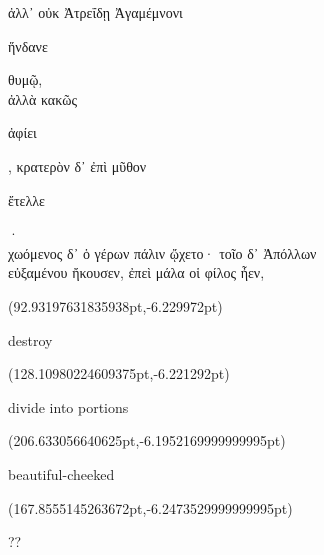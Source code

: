 \documentclass{ransom}
\begin{document}
\begin{foreignpage}
\begin{graytext}
ἀλλ᾽ οὐκ Ἀτρεΐδῃ Ἀγαμέμνονι \begin{whitetext}ἥνδανε\end{whitetext} θυμῷ,\\
ἀλλὰ κακῶς \begin{whitetext}ἀφίει\end{whitetext}, κρατερὸν δ᾽ ἐπὶ μῦθον \begin{whitetext}ἔτελλε\end{whitetext}·\\
χωόμενος δ᾽ ὁ γέρων πάλιν ᾤχετο· τοῖο δ᾽ Ἀπόλλων\hfill{}\\
εὐξαμένου ἤκουσεν, ἐπεὶ μάλα οἱ φίλος ἦεν,\\

\end{graytext}

{\linespread{1.0}\footnotesize \begin{textblock*}{62.27492pt}(92.93197631835938pt,\pdfpageheight-503.3775939941406pt-6.229972pt)\parbox[b]{62.27492pt}{\begin{blacktext}\begin{latin}destroy\end{latin}\end{blacktext}}\end{textblock*}
\begin{textblock*}{49.16702pt}(128.10980224609375pt,\pdfpageheight-476.3775939941406pt-6.221292pt)\parbox[b]{49.16702pt}{\begin{blacktext}\begin{latin}divide into portions\end{latin}\end{blacktext}}\end{textblock*}
\begin{textblock*}{66.25943pt}(206.633056640625pt,\pdfpageheight-449.3775939941406pt-6.1952169999999995pt)\parbox[b]{66.25943pt}{\begin{blacktext}\begin{latin}beautiful-cheeked\end{latin}\end{blacktext}}\end{textblock*}
\begin{textblock*}{59.48206pt}(167.8555145263672pt,\pdfpageheight-422.3775939941406pt-6.2473529999999995pt)\parbox[b]{59.48206pt}{\begin{blacktext}\begin{latin}??\end{latin}\end{blacktext}}\end{textblock*}
}
\end{foreignpage}
\end{document}
